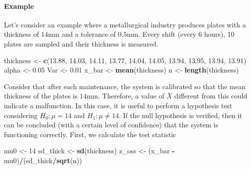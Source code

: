 \documentclass[
]{article}
\newenvironment{Shaded}{\begin{snugshade}}{\end{snugshade}}
\newcommand{\DecValTok}[1]{\textcolor[rgb]{0.00,0.00,0.81}{#1}}
\newcommand{\FloatTok}[1]{\textcolor[rgb]{0.00,0.00,0.81}{#1}}
\newcommand{\FunctionTok}[1]{\textcolor[rgb]{0.13,0.29,0.53}{\textbf{#1}}}
\newcommand{\NormalTok}[1]{#1}
\newcommand{\OtherTok}[1]{\textcolor[rgb]{0.56,0.35,0.01}{#1}}
\newcommand{\SpecialCharTok}[1]{\textcolor[rgb]{0.81,0.36,0.00}{\textbf{#1}}}
\begin{document}
\hypertarget{example}{%
\paragraph{Example}\label{example}}

Let's consider an example where a metallurgical industry produces plates
with a thickness of \(14 \text{mm}\) and a tolerance of
\(0.5 \text{mm}\). Every shift (every 6 hours), 10 plates are sampled
and their thickness is measured.

\begin{Shaded}
\begin{Highlighting}[]
\NormalTok{thickness }\OtherTok{\textless{}{-}} \FunctionTok{c}\NormalTok{(}\FloatTok{13.88}\NormalTok{, }\FloatTok{14.03}\NormalTok{, }\FloatTok{14.11}\NormalTok{, }\FloatTok{13.77}\NormalTok{, }\FloatTok{14.04}\NormalTok{, }\FloatTok{14.05}\NormalTok{, }\FloatTok{13.94}\NormalTok{, }\FloatTok{13.95}\NormalTok{, }\FloatTok{13.94}\NormalTok{, }\FloatTok{13.91}\NormalTok{)}
\NormalTok{alpha }\OtherTok{\textless{}{-}} \FloatTok{0.05}
\NormalTok{Var }\OtherTok{\textless{}{-}} \FloatTok{0.01}
\NormalTok{x\_bar }\OtherTok{\textless{}{-}} \FunctionTok{mean}\NormalTok{(thickness)}
\NormalTok{n }\OtherTok{\textless{}{-}} \FunctionTok{length}\NormalTok{(thickness)}
\end{Highlighting}
\end{Shaded}

Consider that after each maintenance, the system is calibrated so that
the mean thickness of the plates is \(14 \text{mm}\). Therefore, a value
of \(\bar{X}\) different from this could indicate a malfunction. In this
case, it is useful to perform a hypothesis test considering
\(H_0: \mu = 14\) and \(H_1: \mu \neq 14\). If the null hypothesis is
verified, then it can be concluded (with a certain level of confidence)
that the system is functioning correctly. First, we calculate the test
statistic

\begin{Shaded}
\begin{Highlighting}[]
\NormalTok{mu0 }\OtherTok{\textless{}{-}} \DecValTok{14}
\NormalTok{sd\_thick }\OtherTok{\textless{}{-}} \FunctionTok{sd}\NormalTok{(thickness)}
\NormalTok{z\_oss }\OtherTok{\textless{}{-}}\NormalTok{ (x\_bar }\SpecialCharTok{{-}}\NormalTok{ mu0)}\SpecialCharTok{/}\NormalTok{(sd\_thick}\SpecialCharTok{/}\FunctionTok{sqrt}\NormalTok{(n))}
\end{Highlighting}
\end{Shaded}
\end{document}
